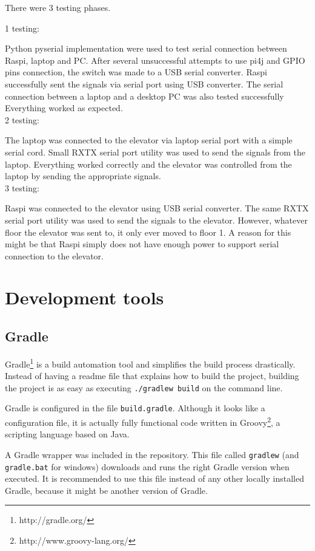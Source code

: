 \documentclass[a4paper, 12pt]{article}
\begin{document}
There were 3 testing phases.

1 testing:

Python pyserial implementation were used to test serial connection between Raspi, laptop and PC.
After several unsuccessful attempts to use pi4j and GPIO pins connection, the switch was made to a USB serial converter.
Raspi successfully sent the signals via serial port using USB converter.
The serial connection between a laptop and a desktop PC was also tested successfully
Everything worked as expected.
\\

2 testing:

The laptop was connected to the elevator via laptop serial port with a simple serial cord.
Small RXTX serial port utility was used to send the signals from the laptop.
Everything worked correctly and the elevator was controlled from the laptop by sending the appropriate signals.
\\

3 testing:

Raspi was connected to the elevator using USB serial converter.
The same RXTX serial port utility was used to send the signals to the elevator.
However, whatever floor the elevator was sent to, it only ever moved to floor 1.
A reason for this might be that Raspi simply does not have enough power to support serial connection to the elevator.


\newpage
\section{Development tools}
\label{sec:Development_tools}
\subsection{Gradle}
Gradle\footnote{http://gradle.org/} is a build automation tool and simplifies the build process drastically.
Instead of having a readme file that explains how to build the project, building the project is as easy as executing \texttt{./gradlew build} on the command line.

Gradle is configured in the file \texttt{build.gradle}.
Although it looks like a configuration file, it is actually fully functional code written in Groovy\footnote{http://www.groovy-lang.org/}, a scripting language based on Java.

A Gradle wrapper was included in the repository.
This file called \texttt{gradlew} (and \texttt{gradle.bat} for windows) downloads and runs the right Gradle version when executed.
It is recommended to use this file instead of any other locally installed Gradle, because it might be another version of Gradle.
\end{document}
